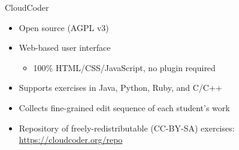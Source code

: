 \documentclass{beamer}
\begin{document}
\begin{frame}{CloudCoder}

\begin{itemize}
  \item Open source (AGPL v3)
  \item Web-based user interface
    \begin{itemize}
    \item 100\% HTML/CSS/JavaScript, no plugin required
    \end{itemize}
  \item Supports exercises in Java, Python, Ruby, and C/C++
  \item Collects fine-grained edit sequence of each student's work
  \item Repository of freely-redistributable (CC-BY-SA) exercises:
        \url{https://cloudcoder.org/repo}
\end{itemize}

\end{frame}

\end{document}
